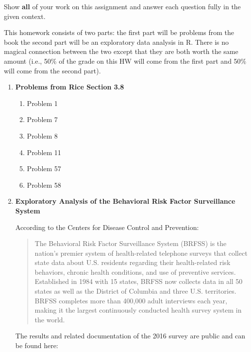 \documentclass[11pt]{article}\usepackage[]{graphicx}\usepackage[]{color}
\begin{document}
\pagestyle{fancy} 

Show \textbf{all} of your work on this assignment and answer each question fully in the given context.

This homework consists of two parts: the first part will be problems from the book the second part will be an exploratory data analysis in R. There is no magical connection between the two except that they are both worth the same amount (i.e., 50\% of the grade on this HW will come from the first part and 50\% will come from the second part).

\begin{enumerate}

\item \textbf{Problems from Rice Section 3.8}

\begin{enumerate}

\item Problem 1

\item Problem 7

\item Problem 8

\item Problem 11

\item Problem 57

\item Problem 58

\end{enumerate}

\item \textbf{Exploratory Analysis of the Behavioral Risk Factor Surveillance System}
      
According to the Centers for Disease Control and Prevention:

\begin{quote}
The Behavioral Risk Factor Surveillance System (BRFSS) is the nation's premier system of health-related telephone surveys that collect state data about U.S. residents regarding their health-related risk behaviors, chronic health conditions, and use of preventive services. Established in 1984 with 15 states, BRFSS now collects data in all 50 states as well as the District of Columbia and three U.S. territories. BRFSS completes more than 400,000 adult interviews each year, making it the largest continuously conducted health survey system in the world.
\end{quote}

The results and related documentation of the 2016 survey are public and can be found here:


\end{enumerate}
\end{document}
